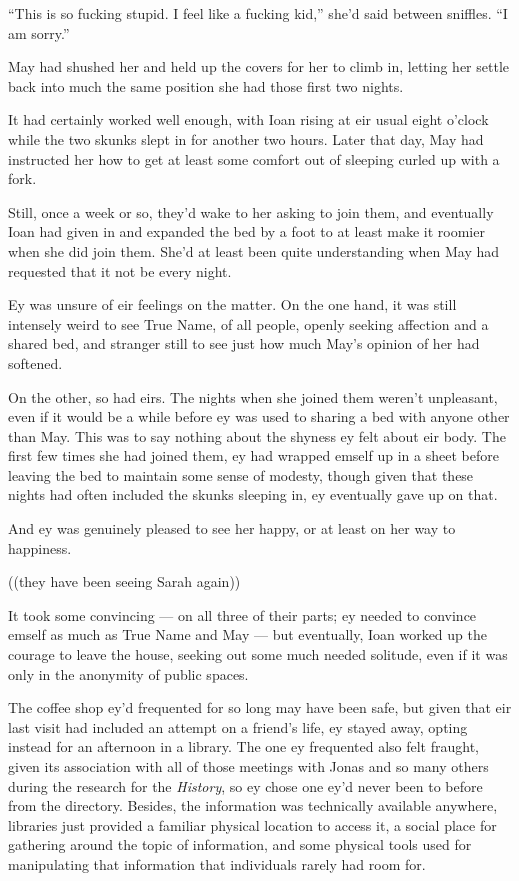 ``This is so fucking stupid. I feel like a fucking kid,'' she'd said between sniffles. ``I am sorry.''

May had shushed her and held up the covers for her to climb in, letting her settle back into much the same position she had those first two nights.

It had certainly worked well enough, with Ioan rising at eir usual eight o'clock while the two skunks slept in for another two hours. Later that day, May had instructed her how to get at least some comfort out of sleeping curled up with a fork.

Still, once a week or so, they'd wake to her asking to join them, and eventually Ioan had given in and expanded the bed by a foot to at least make it roomier when she did join them. She'd at least been quite understanding when May had requested that it not be every night.

Ey was unsure of eir feelings on the matter. On the one hand, it was still intensely weird to see True Name, of all people, openly seeking affection and a shared bed, and stranger still to see just how much May's opinion of her had softened.

On the other, so had eirs. The nights when she joined them weren't unpleasant, even if it would be a while before ey was used to sharing a bed with anyone other than May. This was to say nothing about the shyness ey felt about eir body. The first few times she had joined them, ey had wrapped emself up in a sheet before leaving the bed to maintain some sense of modesty, though given that these nights had often included the skunks sleeping in, ey eventually gave up on that.

And ey was genuinely pleased to see her happy, or at least on her way to happiness.

((they have been seeing Sarah again))

It took some convincing — on all three of their parts; ey needed to convince emself as much as True Name and May — but eventually, Ioan worked up the courage to leave the house, seeking out some much needed solitude, even if it was only in the anonymity of public spaces.

The coffee shop ey'd frequented for so long may have been safe, but given that eir last visit had included an attempt on a friend's life, ey stayed away, opting instead for an afternoon in a library. The one ey frequented also felt fraught, given its association with all of those meetings with Jonas and so many others during the research for the \emph{History}, so ey chose one ey'd never been to before from the directory. Besides, the information was technically available anywhere, libraries just provided a familiar physical location to access it, a social place for gathering around the topic of information, and some physical tools used for manipulating that information that individuals rarely had room for.

